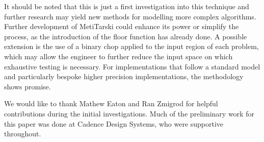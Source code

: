 It should be noted that this is just a first investigation into this technique and further research may yield new methods for modelling more complex algorithms. Further development of MetiTarski could enhance its power or simplify the process, as the introduction of the floor function has already done. A possible extension is the use of a binary chop applied to the input region of each problem, which may allow the engineer to further reduce the input space on which exhaustive testing is necessary. For implementations that follow a standard model and particularly bespoke higher precision implementations, the methodology shows promise.

\begin{acknowledgements}
We would like to thank Mathew Eaton and Ran Zmigrod for helpful contributions during the initial investigations. Much of the preliminary work for this paper was done at Cadence Design Systems, who were supportive throughout. 
\end{acknowledgements}
   
  






